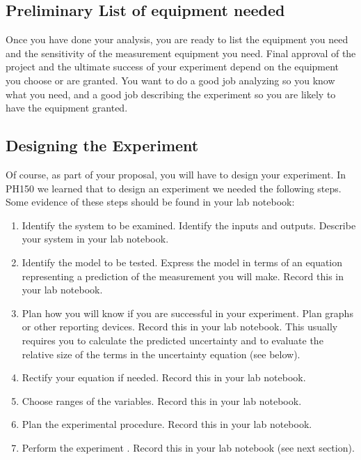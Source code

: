 \subsection{Preliminary List of equipment needed}

Once you have done your analysis, you are ready to list the equipment you need and the sensitivity of the measurement equipment you need. Final approval of the project and the ultimate success of your experiment depend on the equipment you choose or are granted. You want to do a good job analyzing so you know what you need, and a good job describing the experiment so you are likely to have the equipment granted.

\subsection{Designing the Experiment}

Of course, as part of your proposal, you will have to design your experiment. In PH150 we learned that to design an experiment we needed the following steps. Some evidence of these steps should be found in your lab notebook:

\begin{enumerate}
	\item Identify the system to be examined. Identify the inputs and outputs. Describe your system in your lab notebook.
	
	\item Identify the model to be tested. Express the model in terms of an equation representing a prediction of the measurement you will make. Record this in your lab notebook.
	
	\item Plan how you will know if you are successful in your experiment. Plan graphs or other reporting devices. Record this in your lab notebook. This usually requires you to calculate the predicted uncertainty and to evaluate the relative size of the terms in the uncertainty equation (see below).
	
	\item Rectify your equation if needed. Record this in your lab notebook.
	
	\item Choose ranges of the variables. Record this in your lab notebook.
	
	\item Plan the experimental procedure. Record this in your lab notebook.
	
	\item Perform the experiment . Record this in your lab notebook (see next section).
\end{enumerate}

